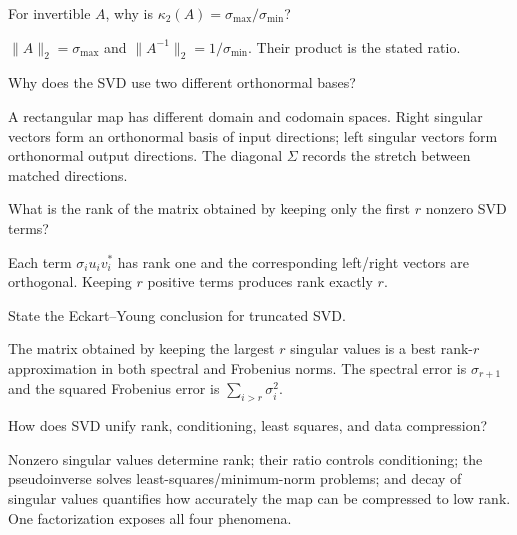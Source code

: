 \begin{problem}\label{prob:i18-problem-08}
For invertible $A$, why is $\kappa_2(A)=\sigma_{\max}/\sigma_{\min}$?
\end{problem}
\begin{solution}
$\|A\|_2=\sigma_{\max}$ and $\|A^{-1}\|_2=1/\sigma_{\min}$. Their product is the stated ratio.
\end{solution}

\begin{problem}\label{prob:i18-problem-09}
Why does the SVD use two different orthonormal bases?
\end{problem}
\begin{solution}
A rectangular map has different domain and codomain spaces. Right singular vectors form an orthonormal basis of input directions; left singular vectors form orthonormal output directions. The diagonal $\Sigma$ records the stretch between matched directions.
\end{solution}

\begin{problem}\label{prob:i18-problem-10}
What is the rank of the matrix obtained by keeping only the first $r$ nonzero SVD terms?
\end{problem}
\begin{solution}
Each term $\sigma_i u_iv_i^*$ has rank one and the corresponding left/right vectors are orthogonal. Keeping $r$ positive terms produces rank exactly $r$.
\end{solution}

\begin{problem}\label{prob:i18-problem-11}
State the Eckart–Young conclusion for truncated SVD.
\end{problem}
\begin{solution}
The matrix obtained by keeping the largest $r$ singular values is a best rank-$r$ approximation in both spectral and Frobenius norms. The spectral error is $\sigma_{r+1}$ and the squared Frobenius error is $\sum_{i>r}\sigma_i^2$.
\end{solution}

\begin{problem}\label{prob:i18-problem-12}
How does SVD unify rank, conditioning, least squares, and data compression?
\end{problem}
\begin{solution}
Nonzero singular values determine rank; their ratio controls conditioning; the pseudoinverse solves least-squares/minimum-norm problems; and decay of singular values quantifies how accurately the map can be compressed to low rank. One factorization exposes all four phenomena.
\end{solution}

